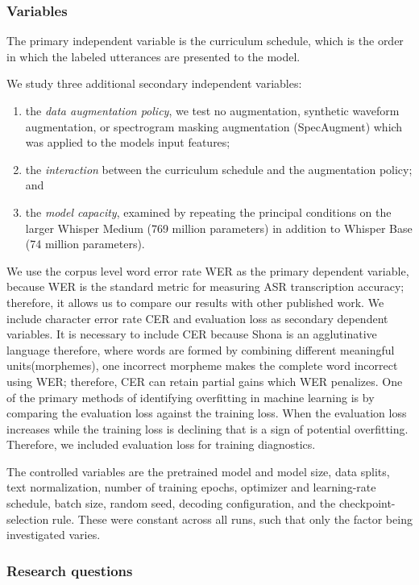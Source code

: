 {\subsubsection{Variables}
The primary independent variable is the curriculum schedule, which is the order in which the labeled utterances are presented to the model.

We study three additional secondary independent variables:
\begin{enumerate}
    \item the \emph{data augmentation policy}, we test no augmentation, synthetic waveform augmentation, or spectrogram masking augmentation (SpecAugment) which was applied to the models input features;
    \item the \emph{interaction} between the curriculum schedule and the augmentation policy; and
    \item the \emph{model capacity}, examined by repeating the principal
    conditions on the larger Whisper Medium (769 million parameters) in addition to 
    Whisper Base (74 million parameters).
\end{enumerate}

We use the corpus level word error rate WER as the primary dependent variable, because WER is the standard metric for measuring ASR transcription accuracy; therefore, it allows us to compare our results with other published work. We include character error rate CER and evaluation loss as secondary dependent variables. It is necessary to include CER because Shona is an agglutinative language therefore, where words are formed by combining different meaningful units(morphemes), one incorrect morpheme makes the complete word incorrect using WER; therefore, CER can retain partial gains which WER penalizes. One of the primary methods of identifying overfitting in machine learning is by comparing the evaluation loss against the training loss. When the evaluation loss increases while the training loss is declining that is a sign of potential overfitting. Therefore, we included evaluation loss for training diagnostics.

The controlled variables are the pretrained model and model size, data splits, text normalization, number of training
epochs, optimizer and learning-rate schedule, batch size, random seed, decoding configuration, and the checkpoint-selection rule. These were constant across all runs, such that only the factor being investigated varies. 

\subsubsection{Research questions}

}
